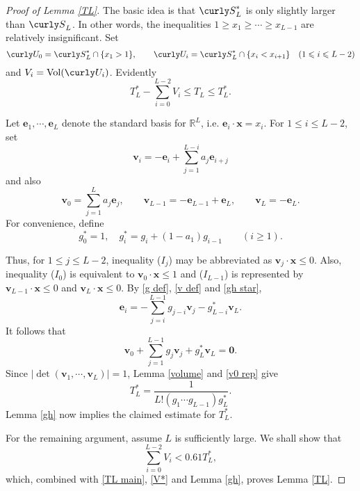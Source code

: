 \documentclass[11pt]{amsart}
\theoremstyle{remark}
\theoremstyle{plain}
\numberwithin{equation}{section}
\newcommand{\RR}{{\mathbb R}}
\newcommand{\be}{\begin{equation}}
\newcommand{\ee}{\end{equation}}
\renewcommand{\(}{\left(}
\renewcommand{\)}{\right)}
\newcommand{\fancyS}{{\curly S}}
\newcommand{\fancyU}{\curly U}
\renewcommand{\le}{\leqslant}
\renewcommand{\ge}{\geqslant}
\newcommand{\vx}{\mathbf{x}}
\DeclareMathOperator{\vvol}{Vol}
\newcommand{\vv}{\mathbf{v}}
\newcommand{\vz}{\mathbf{0}}
\newcommand{\ve}{\mathbf{e}}
\begin{document}
\begin{proof}[Proof of Lemma \ref{TL}]
 The basic idea
is that $\fancyS_L^*$
is only slightly larger than $\fancyS_L$.  In other words,
the inequalities $1 \ge x_1 \ge \cdots \ge x_{L-1}$ are relatively
insignificant.  Set
\[
\fancyU_0 = \fancyS_L^* \cap \{ x_1 > 1 \}, \qquad
\fancyU_i = \fancyS_L^* \cap \{ x_i < x_{i+1} \} \quad (1\le i\le L-2)
\nonumber
\]
and $V_i = \vvol(\fancyU_i)$.  Evidently
\be\label{TL main}
T_L^* - \sum_{i=0}^{L-2} V_i \le T_L \le T_L^*.
\ee

Let $\ve_1, \cdots, \ve_L$ denote the standard basis for $\RR^L$, i.e.
 $\ve_i \cdot \vx = x_i$.
For $1\le i\le L-2$, set
\be\label{v def}
\vv_i = -\ve_i + \sum_{j=1}^{L-i} a_j \ve_{i+j} 
\ee
and also
$$
\vv_0 = \sum_{j=1}^L a_j \ve_j, \qquad \vv_{L-1} = -\ve_{L-1} +\ve_L,
 \qquad\vv_L = -\ve_L.
$$
For convenience, define
\be\label{gh star}
g_0^*=1,\quad g_i^* = g_i + (1-a_1) g_{i-1} \qquad (i\ge 1).
\ee

Thus, for $1\le j \le L-2$, inequality ($I_j$) may be abbreviated as
$\vv_j \cdot \vx \le 0$.  Also, inequality ($I_0$) is equivalent to
$\vv_0 \cdot \vx \le 1$ and ($I_{L-1}$)
is represented by $\vv_{L-1} \cdot \vx \le 0$ and $\vv_L \cdot \vx \le 0$.
By \eqref{g def}, \eqref{v def}
and \eqref{gh star},
\be\label{e rep}
\ve_i = - \sum_{j=i}^{L-1} g_{j-i} \vv_j - g_{L-i}^* \vv_L.
\ee
It follows that
\be\label{v0 rep}
\vv_0 + \sum_{j=1}^{L-1} g_j \vv_j  + g_L^* \vv_L = \vz.
\ee
Since $|\det(\vv_1, \cdots, \vv_L)| = 1$, Lemma \ref{volume} and
\eqref{v0 rep} give
\be\label{V*}
T_L^* = \frac{1}{L! (g_1 \cdots g_{L-1}) g_L^*}.
\ee
Lemma \ref{gh} now implies the claimed estimate for $T_L^*$.

For the remaining argument, assume $L$ is sufficiently large.
We shall show that
\be\label{Vi sum}
\sum_{i=0}^{L-2} V_i < 0.61 T_L^*,
\ee
which, combined with \eqref{TL main}, \eqref{V*} and Lemma
\ref{gh}, proves Lemma \ref{TL}.


\end{proof}
\end{document}
